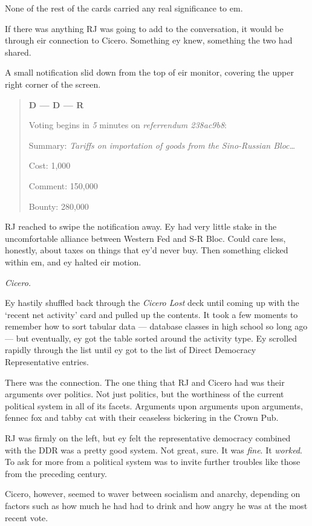 None of the rest of the cards carried any real significance to em.

If there was anything RJ was going to add to the conversation, it would be through eir connection to Cicero. Something ey knew, something the two had shared.

A small notification slid down from the top of eir monitor, covering the upper right corner of the screen.

\begin{quote}
\textbf{D — D — R}

Voting begins in \emph{5} minutes on \emph{referrendum 238ac9b8}:

Summary: \emph{Tariffs on importation of goods from the Sino-Russian Bloc\ldots{}}

Cost: 1,000

Comment: 150,000

Bounty: 280,000
\end{quote}

RJ reached to swipe the notification away. Ey had very little stake in the uncomfortable alliance between Western Fed and S-R Bloc. Could care less, honestly, about taxes on things that ey'd never buy. Then something clicked within em, and ey halted eir motion.

\emph{Cicero.}

Ey hastily shuffled back through the \emph{Cicero Lost} deck until coming up with the `recent net activity' card and pulled up the contents. It took a few moments to remember how to sort tabular data — database classes in high school so long ago — but eventually, ey got the table sorted around the activity type. Ey scrolled rapidly through the list until ey got to the list of Direct Democracy Representative entries.

There was the connection. The one thing that RJ and Cicero had was their arguments over politics. Not just politics, but the worthiness of the current political system in all of its facets. Arguments upon arguments upon arguments, fennec fox and tabby cat with their ceaseless bickering in the Crown Pub.

RJ was firmly on the left, but ey felt the representative democracy combined with the DDR was a pretty good system. Not great, sure. It was \emph{fine}. It \emph{worked}. To ask for more from a political system was to invite further troubles like those from the preceding century.

Cicero, however, seemed to waver between socialism and anarchy, depending on factors such as how much he had had to drink and how angry he was at the most recent vote.

